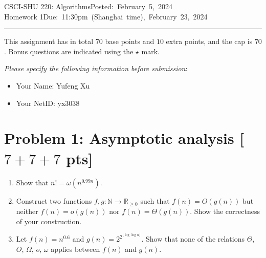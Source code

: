 \documentclass[11pt,twoside]{article}
\newcommand{\homework}[1]{
   \pagestyle{myheadings}
   \thispagestyle{plain}
   \newpage
   \setcounter{page}{1}
   \noindent
   \classname \hfill \mbox{\updatedday} \\
   \instname \hfill \mbox{\duedate}
   \rule{6.5in}{0.5mm}
   \vspace*{-0.1 in}
}
\newcommand{\problem}[1]{\section*{Problem #1}}
\def\classname{CSCI-SHU 220: Algorithms}
\def\updatedday{Posted: February 5, 2024}
\def\duedate{Due: 11:30pm (Shanghai time), February 23, 2024}
\def\instname{Homework 1}
\begin{document}
\homework{1}

This assignment has in total $70$ base points and $10$ extra points, and the cap is $70$.
Bonus questions are indicated using the $\star$ mark.

\textit{Please specify the following information before submission}:
\begin{itemize}
    \item Your Name: Yufeng Xu%
    \item Your NetID: yx3038%
\end{itemize}


\problem{1: Asymptotic analysis [$7+7+7$ pts]} 

\begin{enumerate}
\item Show that $n! = \omega(n^{0.99n})$.
\item Construct two functions $f,g:\mathbb{N} \rightarrow \mathbb{R}_{\geq 0}$ such that $f(n) = O(g(n))$ but neither $f(n)=o(g(n))$ nor $f(n)=\Theta(g(n))$. Show the correctness of your construction.
\item Let $f(n)=n^{0.6}$ and $g(n) = 2^{2^{\lfloor \log\log n \rfloor}}$.
Show that none of the relations $\Theta$, $O$, $\Omega$, $o$, $\omega$ applies between $f(n)$ and $g(n)$.
\end{enumerate}
\end{document}
